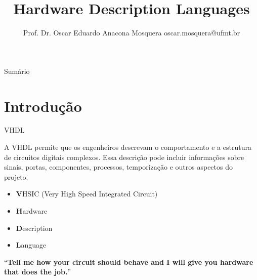 \documentclass[aspectratio=169]{beamer}
\title[Arquitetura de Computadores]{\huge  Hardware Description Languages} %
\author[Prof. Dr. Oscar Eduardo Anacona Mosquera]{Prof. Dr. Oscar Eduardo Anacona Mosquera \newline\newline 
	\scriptsize{oscar.mosquera@ufmt.br}
}%
\begin{document}
	\begin{frame}[plain]
		\titlepage
	\end{frame}
	
	\begin{frame}{Sumário}
		\tableofcontents
	\end{frame}
	


\section{Introdução}


\begin{frame}{VHDL}
	\justifying
	
	\begin{block}{}
		\justifying
		A VHDL permite que os engenheiros descrevam o comportamento e a estrutura de circuitos digitais complexos. Essa descrição pode incluir informações sobre sinais, portas, componentes, processos, temporização e outros aspectos do projeto.
	\end{block}
	
	\begin{itemize}
		\item \textbf{V}HSIC (Very High Speed Integrated Circuit)
		\item \textbf{H}ardware
		\item \textbf{D}escription
		\item \textbf{L}anguage
	\end{itemize}
	
	\begin{alertblock}{}
		``\textbf{Tell me how your circuit should behave and I will give you
			hardware that does the job.}”
	\end{alertblock}	
	
	
\end{frame}
\end{document}
